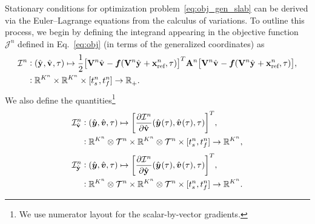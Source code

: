 Stationary conditions for optimization problem~\eqref{eq:obj_gen_slab} can be derived via 
	the Euler--Lagrange equations from the
calculus of variations. To outline this process, we begin by defining the
integrand appearing in the objective function $\mathcal{J}^n$ defined in Eq.~\eqref{eq:obj} (in terms of the generalized
coordinates) as 
\begin{equation}\label{eq:integrand}
\begin{split}
 \minintegrandArg{n} & \vcentcolon
(\genstateyDiscreteArgnt{}, \genstateyDiscreteDotArgnt{},\timeDummy) \mapsto \frac{1}{2} \big[
\basisspaceArg{n} \genstateyDiscreteDotArgnt{} - \velocity(\basisspaceArg{n} \genstateyDiscreteArgnt{}
+ \stateInterceptArg{n},\timeDummy ) \big]^T \stweightingMatArgt{n}{t} \big[
\basisspaceArg{n} \genstateyDiscreteDotArgnt{}  - \velocity(\basisspaceArg{n} \genstateyDiscreteArgnt{} +
\stateInterceptArg{n},\timeDummy) \big], \\ & \vcentcolon \RR{\romdimArg{n}} \times \RR{\romdimArg{n}} \times [\timeStartArg{n},\timeEndArg{n}]
 \rightarrow \RRplus .  
\end{split}
\end{equation}
We also define the quantities\footnote{We use numerator layout for the
scalar-by-vector gradients.}
\begin{equation}
\begin{split}
\dIdVArg{n}  & \vcentcolon
(\genstatey , \genstateyDot, \timeDummy) \mapsto \bigg[ \frac{\partial \minintegrandArg{n}}{\partial \genstateyDiscreteDot} (\genstateyArg{}{\timeDummy}, \genstateyDotArg{}{\timeDummy},\timeDummy) \bigg]^T, \\ 
& \vcentcolon  \RR{\romdimArg{n}} \otimes \timeSpaceArg{n} \times \RR{\romdimArg{n}} \otimes \timeSpaceArg{n} \times [\timeStartArg{n},\timeEndArg{n}]
 \rightarrow \RR{\romdimArg{n}} ,
\end{split}
\end{equation}
\begin{equation}
\begin{split}
\dIdYArg{n}  & \vcentcolon
(\genstatey , \genstateyDot, \timeDummy) \mapsto \bigg[ \frac{\partial \minintegrandArg{n}}{\partial \genstateyDiscrete} (\genstateyArg{}{\timeDummy}, \genstateyDotArg{}{\timeDummy},\timeDummy) \bigg]^T, \\ 
& \vcentcolon  \RR{\romdimArg{n}} \otimes \timeSpaceArg{n} \times \RR{\romdimArg{n}} \otimes \timeSpaceArg{n} \times [\timeStartArg{n},\timeEndArg{n}]
 \rightarrow \RR{\romdimArg{n}} .
\end{split}
\end{equation}

